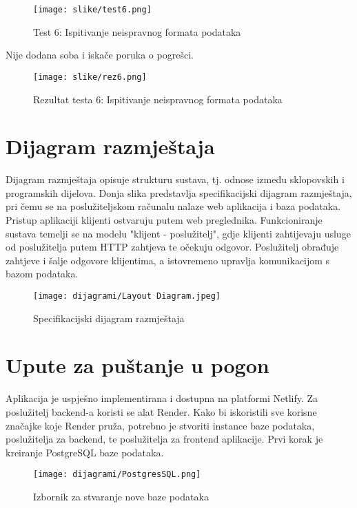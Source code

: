 \begin{figure}[H]
	\texttt{[image: slike/test6.png]}
	\centering
	\caption{Test 6: Ispitivanje neispravnog formata podataka}
	\label{fig:test6}
\end{figure}

Nije dodana soba i iskače poruka o pogrešci. 

\begin{figure}[H]
	\texttt{[image: slike/rez6.png]}
	\centering
	\caption{Rezultat testa 6: Ispitivanje neispravnog formata podataka}
	\label{fig:rez6}
\end{figure}



\eject 


\section{Dijagram razmještaja}

Dijagram razmještaja opisuje strukturu sustava, tj. odnose između sklopovskih i programskih dijelova. Donja slika predstavlja specifikacijski dijagram razmještaja, pri čemu se na poslužiteljskom računalu nalaze web aplikacija i baza podataka. Pristup aplikaciji klijenti ostvaruju putem web preglednika. Funkcioniranje sustava temelji se na modelu "klijent - poslužitelj", gdje klijenti zahtijevaju usluge od poslužitelja putem HTTP zahtjeva te očekuju odgovor. Poslužitelj obrađuje zahtjeve i šalje odgovore klijentima, a istovremeno upravlja komunikacijom s bazom podataka.

\begin{figure}[H]
	\texttt{[image: dijagrami/Layout Diagram.jpeg]}
	\centering
	\caption{Specifikacijski dijagram razmještaja}
	\label{fig:LayoutDiagram}
\end{figure}

\eject 

\section{Upute za puštanje u pogon}

Aplikacija je uspješno implementirana i dostupna na platformi Netlify. Za poslužitelj backend-a koristi se alat Render. Kako bi iskoristili sve korisne značajke koje Render pruža, potrebno je stvoriti instance baze podataka, poslužitelja za backend, te poslužitelja za frontend aplikacije. Prvi korak je kreiranje PostgreSQL baze podataka.

\begin{figure}[H]
	\texttt{[image: dijagrami/PostgresSQL.png]}
	\centering
	\caption{Izbornik za stvaranje nove baze podataka}
	\label{fig:PostgresSQL}
\end{figure}



